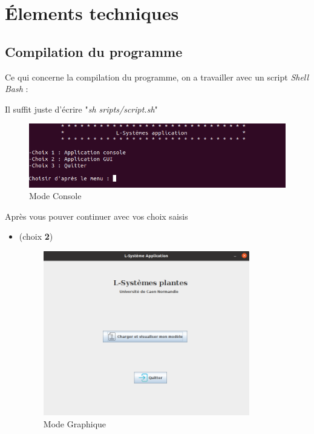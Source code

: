 \section{Élements techniques}
    \subsection{Compilation du programme}
    \begin{onehalfspace}
        \Large{Ce qui concerne la compilation du programme, on a travailler avec
        un script \textit{Shell Bash} :}
        
        \Large{Il suffit juste d'écrire "\textit{sh sripts/script.sh}"}
        \begin{figure}[h]
      \begin{center}
         \includegraphics[width=12cm]{images/cap.png}
      \end{center}
        \caption{Mode Console}
        \label{fig:paquetage}
    \end{figure}
    
     \Large{Après vous pouver continuer avec vos choix saisis}
     \begin{itemize}
         \item (choix \textbf{2})
          \begin{figure}[h]
      \begin{center}
         \includegraphics[width=9cm]{images/cap2.png}
      \end{center}
        \caption{Mode Graphique}
        \label{fig:paquetage}
    \end{figure}
     \end{itemize}
        
        
    \end{onehalfspace}
    \newpage
